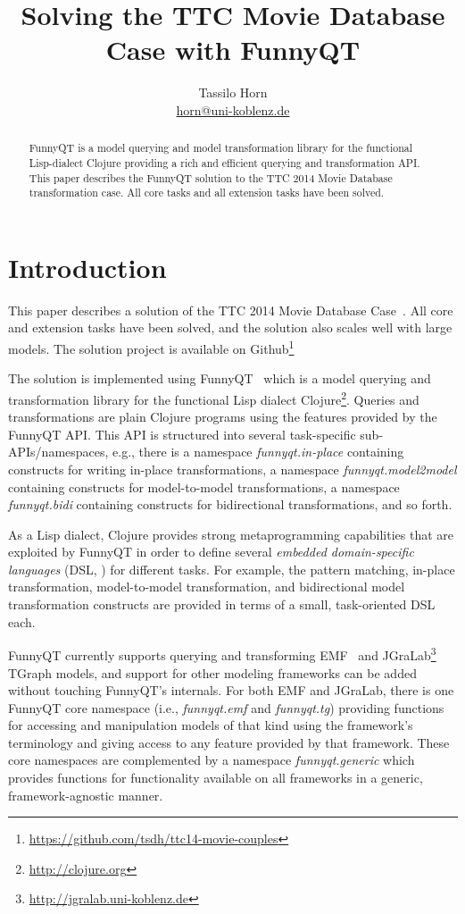 \documentclass[a4paper]{article}
\title{Solving the TTC Movie Database Case with FunnyQT}
\author{Tassilo Horn\\
  \href{mailto:horn@uni-koblenz.de}{horn@uni-koblenz.de}}
\begin{document}
\maketitle

\begin{abstract}
  FunnyQT is a model querying and model transformation library for the
  functional Lisp-dialect Clojure providing a rich and efficient querying and
  transformation API.  This paper describes the FunnyQT solution to the TTC
  2014 Movie Database transformation case.  All core tasks and all extension
  tasks have been solved.
\end{abstract}


\section{Introduction}
\label{sec:introduction}

This paper describes a solution of the TTC 2014 Movie Database
Case~\cite{movies-case-desc}.  All core and extension tasks have been solved,
and the solution also scales well with large models.  The solution project is
available on Github\footnote{\url{https://github.com/tsdh/ttc14-movie-couples}}

The solution is implemented using FunnyQT~\cite{Horn2013MQWFQ} which is a model
querying and transformation library for the functional Lisp dialect
Clojure\footnote{\url{http://clojure.org}}.  Queries and transformations are
plain Clojure programs using the features provided by the FunnyQT API.  This
API is structured into several task-specific sub-APIs/namespaces, e.g., there
is a namespace \emph{funnyqt.in-place} containing constructs for writing
in-place transformations, a namespace \emph{funnyqt.model2model} containing
constructs for model-to-model transformations, a namespace \emph{funnyqt.bidi}
containing constructs for bidirectional transformations, and so forth.

As a Lisp dialect, Clojure provides strong metaprogramming capabilities that
are exploited by FunnyQT in order to define several \emph{embedded
  domain-specific languages} (DSL, \cite{book:Fowler2010DSL}) for different
tasks.  For example, the pattern matching, in-place transformation,
model-to-model transformation, and bidirectional model transformation
constructs are provided in terms of a small, task-oriented DSL each.

FunnyQT currently supports querying and transforming
EMF~\cite{Steinberg2008EEM} and
JGraLab\footnote{\url{http://jgralab.uni-koblenz.de}} TGraph models, and
support for other modeling frameworks can be added without touching FunnyQT's
internals.  For both EMF and JGraLab, there is one FunnyQT core namespace
(i.e., \emph{funnyqt.emf} and \emph{funnyqt.tg}) providing functions for
accessing and manipulation models of that kind using the framework's
terminology and giving access to any feature provided by that framework.  These
core namespaces are complemented by a namespace \emph{funnyqt.generic} which
provides functions for functionality available on all frameworks in a generic,
framework-agnostic manner.
\end{document}
